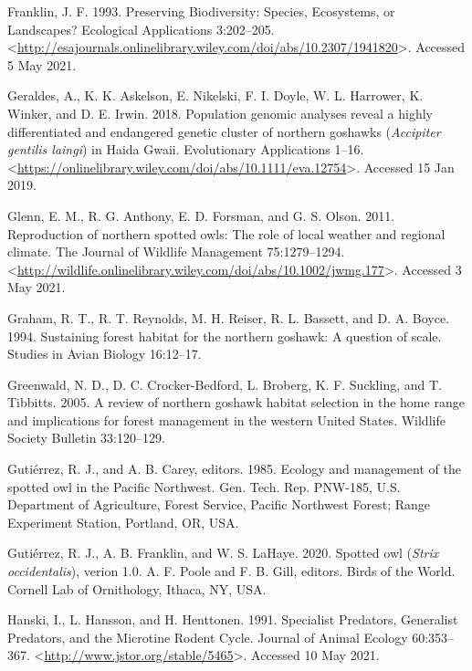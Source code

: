 \documentclass{sfuthesis}
\begin{document}
\leavevmode\hypertarget{ref-franklin_preserving_1993}{}%
Franklin, J. F. 1993. Preserving Biodiversity: Species, Ecosystems, or Landscapes? Ecological Applications 3:202--205. \textless{}\url{http://esajournals.onlinelibrary.wiley.com/doi/abs/10.2307/1941820}\textgreater. Accessed 5 May 2021.

\leavevmode\hypertarget{ref-geraldes_population_2018}{}%
Geraldes, A., K. K. Askelson, E. Nikelski, F. I. Doyle, W. L. Harrower, K. Winker, and D. E. Irwin. 2018. Population genomic analyses reveal a highly differentiated and endangered genetic cluster of northern goshawks (\emph{Accipiter gentilis laingi}) in Haida Gwaii. Evolutionary Applications 1--16. \textless{}\url{https://onlinelibrary.wiley.com/doi/abs/10.1111/eva.12754}\textgreater. Accessed 15 Jan 2019.

\leavevmode\hypertarget{ref-glenn_reproduction_2011}{}%
Glenn, E. M., R. G. Anthony, E. D. Forsman, and G. S. Olson. 2011. Reproduction of northern spotted owls: The role of local weather and regional climate. The Journal of Wildlife Management 75:1279--1294. \textless{}\url{http://wildlife.onlinelibrary.wiley.com/doi/abs/10.1002/jwmg.177}\textgreater. Accessed 3 May 2021.

\leavevmode\hypertarget{ref-graham_sustaining_1994}{}%
Graham, R. T., R. T. Reynolds, M. H. Reiser, R. L. Bassett, and D. A. Boyce. 1994. Sustaining forest habitat for the northern goshawk: A question of scale. Studies in Avian Biology 16:12--17.

\leavevmode\hypertarget{ref-greenwald_review_2005}{}%
Greenwald, N. D., D. C. Crocker-Bedford, L. Broberg, K. F. Suckling, and T. Tibbitts. 2005. A review of northern goshawk habitat selection in the home range and implications for forest management in the western United States. Wildlife Society Bulletin 33:120--129.

\leavevmode\hypertarget{ref-gutierrez_ecology_1985}{}%
Gutiérrez, R. J., and A. B. Carey, editors. 1985. Ecology and management of the spotted owl in the Pacific Northwest. Gen. Tech. Rep. PNW-185, U.S. Department of Agriculture, Forest Service, Pacific Northwest Forest; Range Experiment Station, Portland, OR, USA.

\leavevmode\hypertarget{ref-gutierrez_spotted_2020}{}%
Gutiérrez, R. J., A. B. Franklin, and W. S. LaHaye. 2020. Spotted owl (\emph{Strix occidentalis}), verion 1.0. A. F. Poole and F. B. Gill, editors. Birds of the World. Cornell Lab of Ornithology, Ithaca, NY, USA.

\leavevmode\hypertarget{ref-hanski_specialist_1991}{}%
Hanski, I., L. Hansson, and H. Henttonen. 1991. Specialist Predators, Generalist Predators, and the Microtine Rodent Cycle. Journal of Animal Ecology 60:353--367. \textless{}\url{http://www.jstor.org/stable/5465}\textgreater. Accessed 10 May 2021.
\end{document}

